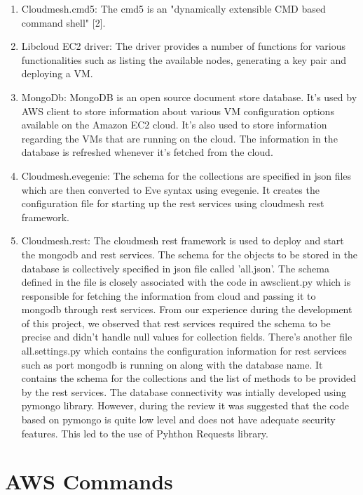 \documentclass[9pt,twocolumn,twoside]{../../styles/osajnl}
\begin{document}
\begin{enumerate}
	\item Cloudmesh.cmd5: The cmd5 is an "dynamically extensible CMD based command shell" [2].

	\item Libcloud EC2 driver: The driver provides a number of functions for various functionalities such as listing the available nodes, generating a key pair and deploying a VM.

	\item MongoDb: MongoDB is an open source document store database. It's used by AWS client to store information about various VM configuration options available on the Amazon EC2 cloud. It's also used to store information regarding the VMs that are running on the cloud. The information in the database is refreshed whenever it's fetched from the cloud.

	\item Cloudmesh.evegenie: The schema for the collections are specified in json files which are then converted to Eve syntax using evegenie. It creates the configuration file for starting up the rest services using cloudmesh rest framework.
	 	
	\item Cloudmesh.rest: The cloudmesh rest framework is used to deploy and start the mongodb and rest services. The schema for the objects to be stored in the database is collectively specified in json file called 'all.json'. The schema defined in the file is closely associated with the code in awsclient.py which is responsible for fetching the information from cloud and passing it to mongodb through rest services. From our experience during the development of this project, we observed that rest services required the schema to be precise and didn't handle null values for collection fields. There's another file all.settings.py which contains the configuration information for rest services such as port mongodb is running on along with the database name. It contains the schema for the collections and the list of methods to be provided by the rest services. The database connectivity was intially developed using pymongo library. However, during the review it was suggested that the code based on pymongo is quite low level and does not have adequate security features. This led to the use of Pyhthon Requests library.
	
\end{enumerate}

\section{AWS Commands}
\end{document}
